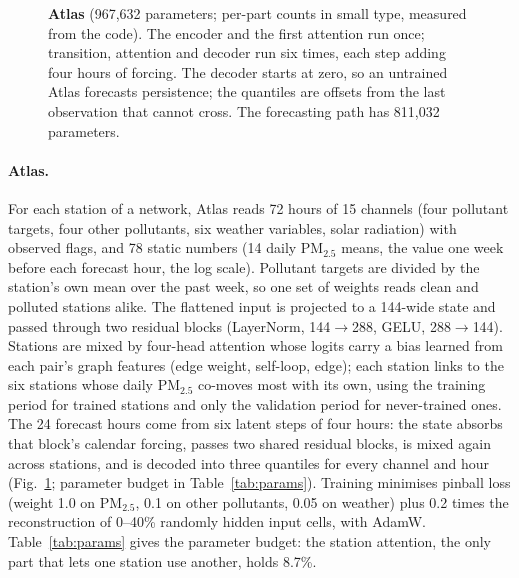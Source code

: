 \documentclass{article}
\newcommand{\pmtf}{PM$_{2.5}$}
\begin{document}
\begin{figure}[t]
{}
\caption{\textbf{Atlas} (967,632 parameters; per-part counts in small type, measured from the code). The encoder and the
first attention run once; transition, attention and decoder run six times, each step adding four hours of forcing.
The decoder starts at zero, so an untrained Atlas forecasts persistence; the quantiles are offsets from the last
observation that cannot cross. The forecasting path has 811,032 parameters.}
\label{fig:atlas}
\end{figure}

\paragraph{Atlas.} For each station of a network, Atlas reads 72 hours of 15 channels (four pollutant targets, four
other pollutants, six weather variables, solar radiation) with observed flags, and 78 static numbers (14 daily \pmtf{}
means, the value one week before each forecast hour, the log scale). Pollutant targets are divided by the station's own
mean over the past week, so one set of weights reads clean and polluted stations alike. The flattened input is
projected to a 144-wide state and passed through two residual blocks (LayerNorm, 144$\to$288, GELU, 288$\to$144).
Stations are mixed by four-head attention whose logits carry a bias learned from each pair's graph features (edge
weight, self-loop, edge); each station links to the six stations whose daily \pmtf{} co-moves most with its own, using
the training period for trained stations and only the validation period for never-trained ones. The 24 forecast hours
come from six latent steps of four hours: the state absorbs that block's calendar forcing, passes two shared residual
blocks, is mixed again across stations, and is decoded into three quantiles for every channel and hour
(Fig.~\ref{fig:atlas}; parameter budget in Table~\ref{tab:params}). Training minimises pinball loss (weight 1.0 on \pmtf{}, 0.1 on other pollutants, 0.05 on
weather) plus 0.2 times the reconstruction of 0--40\% randomly hidden input cells, with AdamW. Table~\ref{tab:params}
gives the parameter budget: the station attention, the only part that lets one station use another, holds 8.7\%.
\end{document}
